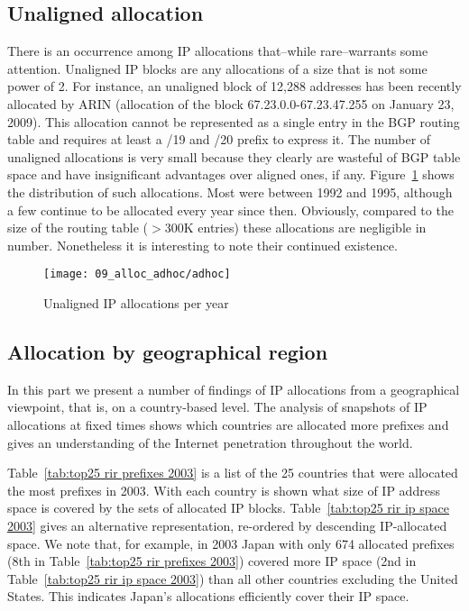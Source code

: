 \subsection{Unaligned allocation}

There is an occurrence among IP allocations that--while rare--warrants some
attention. Unaligned IP blocks are any allocations of a size that is not some
power of 2. For instance, an unaligned block of 12,288 addresses has been
recently allocated by ARIN (allocation of the block 67.23.0.0-67.23.47.255 on
January 23, 2009). This allocation cannot be represented as a single entry in
the BGP routing table and requires at least a /19 and /20 prefix to express it.
The number of unaligned allocations is very small because they clearly are
wasteful of BGP table space and have insignificant advantages over aligned
ones, if any. Figure~\ref{fig:unaligned IP allocations} shows the distribution
of such allocations. Most were between 1992 and 1995, although a few continue
to be allocated every year since then. Obviously, compared to the size of the
routing table ($>$300K entries) these allocations are negligible in number.
Nonetheless it is interesting to note their continued existence.

\begin{figure}[htbp]
 	\centering
 		\texttt{[image: 09\_alloc\_adhoc/adhoc]}
	\caption{Unaligned IP allocations per year}
 	\label{fig:unaligned IP allocations}
\end{figure}

\subsection{Allocation by geographical region}




In this part we present a number of findings of IP allocations from a
geographical viewpoint, that is, on a country-based level. The analysis of
snapshots of IP allocations at fixed times shows which countries are
allocated more prefixes and gives an understanding of the Internet penetration
throughout the world.

Table~\ref{tab:top25 rir prefixes 2003} is a list of the 25 countries that were
allocated the most prefixes in 2003.  With each country is shown what size of
IP address space is covered by the sets of allocated IP blocks.
Table~\ref{tab:top25 rir ip space 2003} gives an alternative representation,
re-ordered by descending IP-allocated space.  We note that, for example, in
2003 Japan with only 674 allocated prefixes (8th in Table~\ref{tab:top25 rir
prefixes 2003}) covered more IP space (2nd in Table~\ref{tab:top25 rir ip space
2003}) than all other countries excluding the United States.  This indicates
Japan's allocations efficiently cover their IP space.


